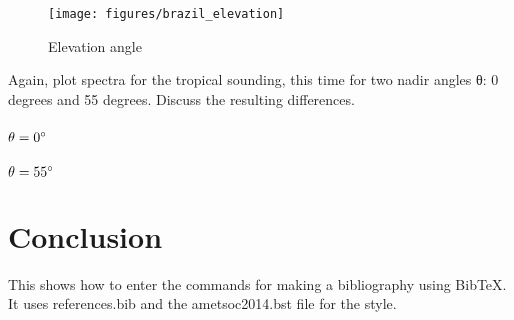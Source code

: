 \documentclass[twocol]{ametsoc}
\begin{document}
\begin{figure}
	\centering
	\texttt{[image: figures/brazil\_elevation]}
	\caption{Elevation angle}
	\label{fig:elevation}
\end{figure}

Again, plot spectra for the tropical sounding, this time for two nadir angles θ:  0 degrees and 55 degrees.  Discuss the resulting differences.
\subsubsection{$\theta = 0 \degree{} $}
\subsubsection{$\theta = 55 \degree{} $}


\section{Conclusion}

 This shows how to enter the commands for making a bibliography using
 BibTeX. It uses references.bib and the ametsoc2014.bst file for the style.

 
 
\end{document}
